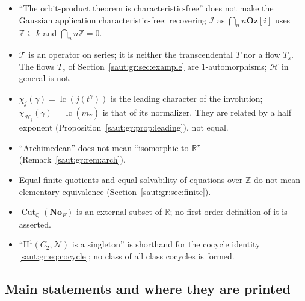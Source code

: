\documentclass[11pt]{article}
\theoremstyle{definition}
\theoremstyle{remark}
\newcommand{\No}{\mathbf{No}}
\newcommand{\R}{\mathbb R}
\newcommand{\Q}{\mathbb Q}
\newcommand{\Z}{\mathbb Z}
\newcommand{\lc}{\operatorname{lc}}
\newcommand{\Oz}{\mathbf{Oz}}
\newcommand{\Ineg}{\mathcal I}
\numberwithin{equation}{section}
\begin{document}
\begin{itemize}
\item ``The orbit-product theorem is characteristic-free'' does not make the Gaussian
application characteristic-free: recovering $\Ineg$ as $\bigcap_nn\Oz[i]$ uses
$\Z\subseteq k$ and $\bigcap_nn\Z=0$.
\item $\mathcal T$ is an operator on series; it is neither the transcendental $T$ nor a
flow $T_s$. The flows $T_s$ of Section~\ref{saut:gr:sec:example} are
$1$-automorphisms; $\mathcal H$ in general is not.
\item $\chi_j(\gamma)=\lc(j(t^\gamma))$ is the leading character of the involution;
$\chi_{\mathcal H_j}(\gamma)=\lc(m_\gamma)$ is that of its normalizer. They are related
by a half exponent (Proposition~\ref{saut:gr:prop:leading}), not equal.
\item ``Archimedean'' does not mean ``isomorphic to $\R$''
(Remark~\ref{saut:gr:rem:arch}).
\item Equal finite quotients and equal solvability of equations over $\Z$ do not mean
elementary equivalence (Section~\ref{saut:gr:sec:finite}).
\item $\operatorname{Cut}_\Q(\No_F)$ is an external subset of $\R$; no first-order
definition of it is asserted.
\item ``$\mathrm H^1(C_2,\mathcal N)$ is a singleton'' is shorthand for the cocycle
identity \eqref{saut:gr:eq:cocycle}; no class of all class cocycles is formed.
\end{itemize}

\subsection{Main statements and where they are printed}\label{saut:gr:sec:map}
\end{document}
